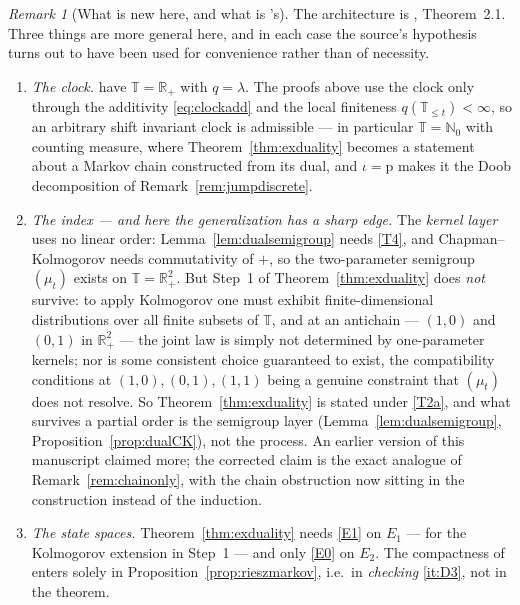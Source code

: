 \documentclass[11pt,a4paper]{article}
\theoremstyle{plain}
\theoremstyle{definition}
\theoremstyle{remark}
\newtheorem{remark}[theorem]{Remark}
\newcommand{\R}{\mathbb{R}}
\newcommand{\N}{\mathbb{N}}
\newcommand{\Rp}{\R_+}
\newcommand{\T}{\mathbb{T}}                     %
\newcommand{\DGP}{\cite{DGP24}}
\begin{document}
\begin{remark}[What is new here, and what is \DGP's]
  \label{rem:exdualityscope}
  The architecture is \DGP, Theorem~2.1.  Three things are more general here, and
  in each case the source's hypothesis turns out to have been used for
  convenience rather than of necessity.
  \begin{enumerate}[label=(\roman*)]
  \item \emph{The clock.}  \DGP{} have $\T = \Rp$ with $q = \lambda$.  The proofs
    above use the clock only through the additivity \eqref{eq:clockadd} and the
    local finiteness $q(\T_{\leq t}) < \infty$, so an arbitrary shift invariant
    clock is admissible --- in particular $\T = \N_0$ with counting measure, where
    Theorem~\ref{thm:exduality} becomes a statement about a Markov chain
    constructed from its dual, and $\iota = \mathrm{p}$ makes it the Doob
    decomposition of Remark~\ref{rem:jumpdiscrete}.
  \item \emph{The index --- and here the generalization has a sharp edge.}  The
    \emph{kernel layer} uses no linear order: Lemma~\ref{lem:dualsemigroup} needs
    \eqref{T4}, and Chapman--Kolmogorov needs commutativity of $+$, so the two-parameter
    semigroup $(\mu_t)$ exists on $\T = \Rp^2$.  But Step~1 of
    Theorem~\ref{thm:exduality} does \emph{not} survive: to apply Kolmogorov one
    must exhibit finite-dimensional distributions over all finite subsets of
    $\T$, and at an antichain --- $(1,0)$ and $(0,1)$ in $\Rp^2$ --- the joint law
    is simply not determined by one-parameter kernels; nor is some consistent
    choice guaranteed to exist, the compatibility conditions at
    $(1,0),(0,1),(1,1)$ being a genuine constraint that $(\mu_t)$ does not
    resolve.  So Theorem~\ref{thm:exduality} is stated under \eqref{T2a}, and what
    survives a partial order is the semigroup layer
    (Lemma~\ref{lem:dualsemigroup}, Proposition~\ref{prop:dualCK}), not the
    process.  An earlier version of this manuscript claimed more; the corrected
    claim is the exact analogue of Remark~\ref{rem:chainonly}, with the chain
    obstruction now sitting in the construction instead of the induction.
  \item \emph{The state spaces.}  Theorem~\ref{thm:exduality} needs \eqref{E1} on $E_1$
    --- for the Kolmogorov extension in Step~1 --- and only \eqref{E0} on $E_2$.  The
    compactness of \DGP{} enters solely in
    Proposition~\ref{prop:rieszmarkov}, i.e.\ in \emph{checking} \ref{it:D3}, not
    in the theorem.
  \end{enumerate}


\end{remark}
\end{document}
